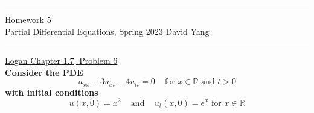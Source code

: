 \documentclass[11pt]{article}
\begin{document}
	\hrule
	\begin{center}
		{\Large Homework 5} \\ %
		\vspace{0.2cm}
		Partial Differential Equations, Spring 2023 \hfill David Yang %
	\end{center}

\hrule

\vspace{1em}

\underline{Logan Chapter 1.7, Problem 6} \\

\textbf{Consider the PDE \[u_{xx} - 3u_{xt} - 4u_{tt} = 0 \, \, \, \, \, \text{ for } x \in \mathbb{R} \text { and } t > 0\] with initial conditions 
\[u(x, 0) = x^2 \, \, \, \, \, \text{ and } \, \, \, \, \, u_t(x, 0) = e^x \text{ for } x \in \mathbb{R}\]}
\end{document}
